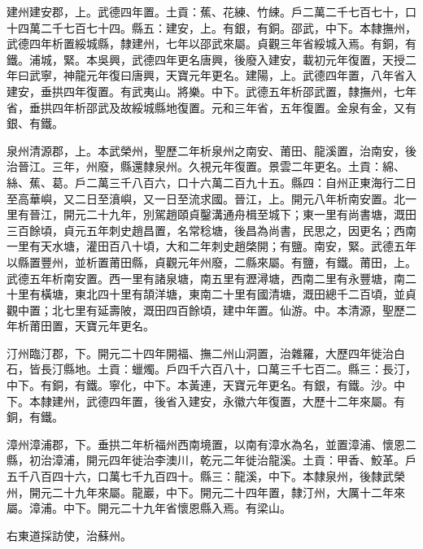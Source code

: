 \begin{pinyinscope}
 建州建安郡，上。武德四年置。土貢：蕉、花練、竹綀。戶二萬二千七百七十，口十四萬二千七百七十四。縣五：建安，上。有銀，有銅。邵武，中下。本隸撫州，武德四年析置綏城縣，隸建州，七年以邵武來屬。貞觀三年省綏城入焉。有銅，有鐵。浦城，緊。本吳興，武德四年更名唐興，後廢入建安，載初元年復置，天授二年曰武寧，神龍元年復曰唐興，天寶元年更名。建陽，上。武德四年置，八年省入建安，垂拱四年復置。有武夷山。將樂。中下。武德五年析邵武置，隸撫州，七年省，垂拱四年析邵武及故綏城縣地復置。元和三年省，五年復置。金泉有金，又有銀、有鐵。



 泉州清源郡，上。本武榮州，聖歷二年析泉州之南安、莆田、龍溪置，治南安，後治晉江。三年，州廢，縣還隸泉州。久視元年復置。景雲二年更名。土貢：綿、絲、蕉、葛。戶二萬三千八百六，口十六萬二百九十五。縣四：自州正東海行二日至高華嶼，又二日至濆嶼，又一日至流求國。晉江，上。開元八年析南安置。北一里有晉江，開元二十九年，別駕趙頤貞鑿溝通舟楫至城下；東一里有尚書塘，溉田三百餘頃，貞元五年刺史趙昌置，名常稔塘，後昌為尚書，民思之，因更名；西南一里有天水塘，灌田百八十頃，大和二年刺史趙棨開；有鹽。南安，緊。武德五年以縣置豐州，並析置莆田縣，貞觀元年州廢，二縣來屬。有鹽，有鐵。莆田，上。武德五年析南安置。西一里有諸泉塘，南五里有瀝潯塘，西南二里有永豐塘，南二十里有橫塘，東北四十里有頡洋塘，東南二十里有國清塘，溉田總千二百頃，並貞觀中置；北七里有延壽陂，溉田四百餘頃，建中年置。仙游。中。本清源，聖歷二年析莆田置，天寶元年更名。



 汀州臨汀郡，下。開元二十四年開福、撫二州山洞置，治雜羅，大歷四年徙治白石，皆長汀縣地。土貢：蠟燭。戶四千六百八十，口萬三千七百二。縣三：長汀，中下。有銅，有鐵。寧化，中下。本黃連，天寶元年更名。有銀，有鐵。沙。中下。本隸建州，武德四年置，後省入建安，永徽六年復置，大歷十二年來屬。有銅，有鐵。



 漳州漳浦郡，下。垂拱二年析福州西南境置，以南有漳水為名，並置漳浦、懷恩二縣，初治漳浦，開元四年徙治李澳川，乾元二年徙治龍溪。土貢：甲香、鮫革。戶五千八百四十六，口萬七千九百四十。縣三：龍溪，中下。本隸泉州，後隸武榮州，開元二十九年來屬。龍巖，中下。開元二十四年置，隸汀州，大厲十二年來屬。漳浦。中下。開元二十九年省懷恩縣入焉。有梁山。



 右東道採訪使，治蘇州。




\end{pinyinscope}
